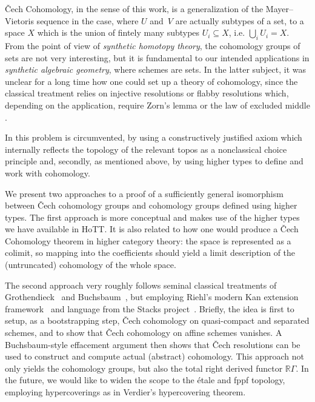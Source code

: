 \documentclass[letterpaper]{../util/easychair}
\begin{document}
\v{C}ech Cohomology, in the sense of this work,
is a generalization of the Mayer--Vietoris sequence in the case, where $U$ and~$V$ are actually subtypes of a set,
to a space $X$ which is the union of fintely many subtypes $U_i\subseteq X$, i.e. $\bigcup_{i}U_i=X$.
From the point of view of \emph{synthetic homotopy theory}, the cohomology groups of sets are not very interesting,
but it is fundamental to our intended applications in \emph{synthetic algebraic geometry}, where schemes are sets.
In the latter subject, it was unclear for a long time how one could set up a theory of cohomology,
since the classical treatment relies on injective resolutions or flabby resolutions which, depending on the application, require Zorn's lemma or the law of excluded middle \cite{blechschmidt-flabby}.

In \cite{draft} this problem is circumvented,
by using a constructively justified axiom which internally reflects the topology of the relevant topos
as a nonclassical choice principle
and, secondly, as mentioned above, by using higher types to define and work with cohomology.

We present two approaches to a proof of a sufficiently general isomorphism between \v{C}ech cohomology groups
and cohomology groups defined using higher types.
The first approach is more conceptual and makes use of the higher types we have available in HoTT.
It is also related to how one would produce a \v{C}ech Cohomology theorem in higher category theory:
the space is represented as a colimit, so mapping into the coefficients should yield a limit description of
the (untruncated) cohomology of the whole space.

The second approach very roughly follows seminal classical treatments of Grothendieck~\cite{tohoku1957} and Buchsbaum~\cite{buchsbaum}, but employing Riehl's modern Kan extension framework~\cite{riehl-cathtpy} and language from the Stacks project~\cite{stacks-project}.
Briefly, the idea is first to setup, as a bootstrapping step, \v{C}ech
cohomology on quasi-compact and separated schemes, and to show that \v{C}ech
cohomology on affine schemes vanishes. A Buchsbaum-style effacement argument
then shows that \v{C}ech resolutions can be used to construct and
compute actual (abstract) cohomology. This approach not only yields the
cohomology groups, but also the total right derived functor $\mathbb{R}\Gamma$.
In the future, we would like to widen the scope to the étale and fppf
topology, employing hypercoverings as in Verdier's hypercovering theorem.
\end{document}
